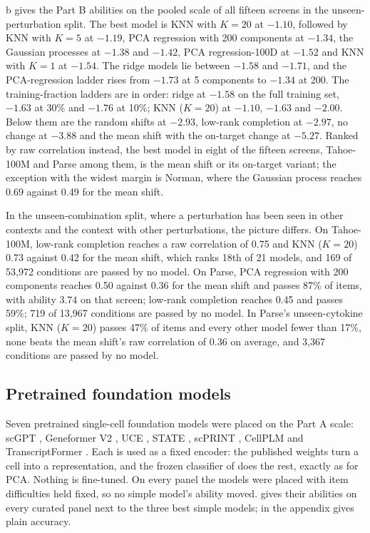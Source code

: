 \documentclass[]{style}
\begin{document}
b gives the Part B abilities on the pooled scale of all fifteen
screens in the unseen-perturbation split. The best model is KNN with $K=20$ at $-1.10$,
followed by KNN with $K=5$ at $-1.19$, PCA regression with 200 components at $-1.34$, the
Gaussian processes at $-1.38$ and $-1.42$, PCA regression-100D at $-1.52$ and KNN with
$K=1$ at $-1.54$. The ridge models lie between $-1.58$ and $-1.71$, and the PCA-regression
ladder rises from $-1.73$ at 5 components to $-1.34$ at 200. The training-fraction ladders
are in order: ridge at $-1.58$ on the full training set, $-1.63$ at 30\% and $-1.76$ at
10\%; KNN ($K=20$) at $-1.10$, $-1.63$ and $-2.00$. Below them are the random shifts at
$-2.93$, low-rank completion at $-2.97$, no change at $-3.88$ and the mean shift with the
on-target change at $-5.27$. Ranked by raw correlation instead, the best model in eight of
the fifteen screens, Tahoe-100M and Parse among them, is the mean shift or its on-target
variant; the exception with the widest margin is Norman, where the Gaussian process reaches
0.69 against 0.49 for the mean shift.

In the unseen-combination split, where a perturbation has been seen in other contexts and
the context with other perturbations, the picture differs. On Tahoe-100M, low-rank
completion reaches a raw correlation of 0.75 and KNN ($K=20$) 0.73 against 0.42 for the
mean shift, which ranks 18th of 21 models, and 169 of 53,972 conditions are passed by no
model. On Parse, PCA regression with 200 components reaches 0.50 against 0.36 for the
mean shift and passes 87\% of items, with ability $3.74$ on that screen; low-rank
completion reaches 0.45 and passes 59\%; 719 of 13,967 conditions are passed by no model.
In Parse's unseen-cytokine split, KNN ($K=20$) passes 47\% of items and every other model
fewer than 17\%, none beats the mean shift's raw correlation of 0.36 on average, and 3,367
conditions are passed by no model.

\subsection{Pretrained foundation models}
\label{sec:fm}

Seven pretrained single-cell foundation models were placed on the Part A scale: scGPT
\citep{scgpt}, Geneformer V2 \citep{geneformer}, UCE \citep{uce}, STATE \citep{state},
scPRINT \citep{scprint}, CellPLM \citep{cellplm} and TranscriptFormer
\citep{transcriptformer}. Each is used as a fixed encoder: the published weights turn a
cell into a representation, and the frozen classifier of  does the rest,
exactly as for PCA. Nothing is fine-tuned. On every panel the models were placed with item
difficulties held fixed, so no simple model's ability moved.  gives their
abilities on every curated panel next to the three best simple models; 
in the appendix gives plain accuracy.
\end{document}
